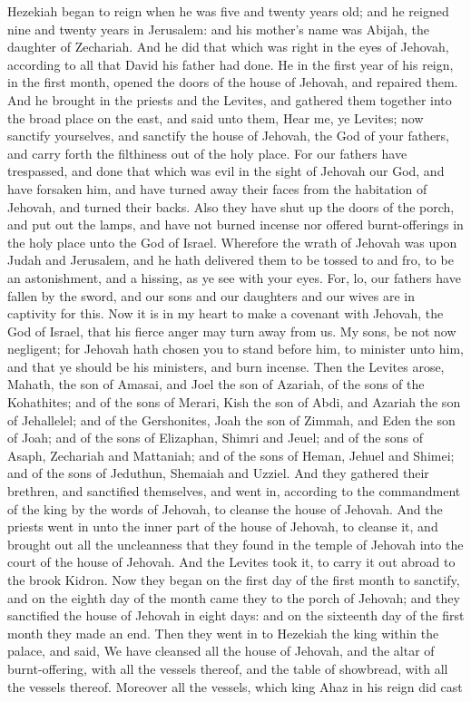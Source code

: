 Hezekiah began to reign when he was five and twenty years old; and he reigned nine and twenty years in Jerusalem: and his mother’s name was Abijah, the daughter of Zechariah. And he did that which was right in the eyes of Jehovah, according to all that David his father had done. He in the first year of his reign, in the first month, opened the doors of the house of Jehovah, and repaired them. And he brought in the priests and the Levites, and gathered them together into the broad place on the east, and said unto them, Hear me, ye Levites; now sanctify yourselves, and sanctify the house of Jehovah, the God of your fathers, and carry forth the filthiness out of the holy place. For our fathers have trespassed, and done that which was evil in the sight of Jehovah our God, and have forsaken him, and have turned away their faces from the habitation of Jehovah, and turned their backs. Also they have shut up the doors of the porch, and put out the lamps, and have not burned incense nor offered burnt-offerings in the holy place unto the God of Israel. Wherefore the wrath of Jehovah was upon Judah and Jerusalem, and he hath delivered them to be tossed to and fro, to be an astonishment, and a hissing, as ye see with your eyes. For, lo, our fathers have fallen by the sword, and our sons and our daughters and our wives are in captivity for this. Now it is in my heart to make a covenant with Jehovah, the God of Israel, that his fierce anger may turn away from us. My sons, be not now negligent; for Jehovah hath chosen you to stand before him, to minister unto him, and that ye should be his ministers, and burn incense.  Then the Levites arose, Mahath, the son of Amasai, and Joel the son of Azariah, of the sons of the Kohathites; and of the sons of Merari, Kish the son of Abdi, and Azariah the son of Jehallelel; and of the Gershonites, Joah the son of Zimmah, and Eden the son of Joah; and of the sons of Elizaphan, Shimri and Jeuel; and of the sons of Asaph, Zechariah and Mattaniah; and of the sons of Heman, Jehuel and Shimei; and of the sons of Jeduthun, Shemaiah and Uzziel. And they gathered their brethren, and sanctified themselves, and went in, according to the commandment of the king by the words of Jehovah, to cleanse the house of Jehovah. And the priests went in unto the inner part of the house of Jehovah, to cleanse it, and brought out all the uncleanness that they found in the temple of Jehovah into the court of the house of Jehovah. And the Levites took it, to carry it out abroad to the brook Kidron. Now they began on the first day of the first month to sanctify, and on the eighth day of the month came they to the porch of Jehovah; and they sanctified the house of Jehovah in eight days: and on the sixteenth day of the first month they made an end. Then they went in to Hezekiah the king within the palace, and said, We have cleansed all the house of Jehovah, and the altar of burnt-offering, with all the vessels thereof, and the table of showbread, with all the vessels thereof. Moreover all the vessels, which king Ahaz in his reign did cast 